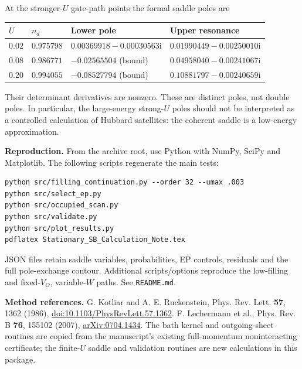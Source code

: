 \documentclass[11pt]{article}
\newcommand{\ii}{\mathrm{i}}
\begin{document}
At the stronger-$U$ gate-path points the formal saddle poles are
\begin{center}
\begin{tabular}{llll}
\toprule
$U$ & $n_d$ & Lower pole & Upper resonance\\
\midrule
$0.02$ & $0.975798$ & $0.00369918-0.00030563\ii$ & $0.01990449-0.00250010\ii$\\
$0.08$ & $0.986771$ & $-0.02565504$ (bound) & $0.04958040-0.00241067\ii$\\
$0.20$ & $0.994055$ & $-0.08527794$ (bound) & $0.10881797-0.00240659\ii$\\
\bottomrule
\end{tabular}
\end{center}
Their determinant derivatives are nonzero. These are distinct poles, not
double poles. In particular, the large-energy strong-$U$ poles should not be
interpreted as a controlled calculation of Hubbard satellites: the coherent
saddle is a low-energy approximation.

\textbf{Reproduction.} From the archive root, use Python with NumPy, SciPy and
Matplotlib. The following scripts regenerate the main tests:
\begin{verbatim}
python src/filling_continuation.py --order 32 --umax .003
python src/select_ep.py
python src/occupied_scan.py
python src/validate.py
python src/plot_results.py
pdflatex Stationary_SB_Calculation_Note.tex
\end{verbatim}
JSON files retain saddle variables, probabilities, EP controls, residuals and
the full pole-exchange contour. Additional scripts/options reproduce the
low-filling and fixed-$V_O$, variable-$W$ paths. See \texttt{README.md}.

\textbf{Method references.}
G. Kotliar and A. E. Ruckenstein, Phys. Rev. Lett. \textbf{57}, 1362 (1986),
\href{https://doi.org/10.1103/PhysRevLett.57.1362}{doi:10.1103/PhysRevLett.57.1362}.
F. Lechermann et al., Phys. Rev. B \textbf{76}, 155102 (2007),
\href{https://arxiv.org/abs/0704.1434}{arXiv:0704.1434}.
The bath kernel and outgoing-sheet routines are copied from the manuscript's
existing full-momentum noninteracting certificate; the finite-$U$ saddle and
validation routines are new calculations in this package.
\end{document}
